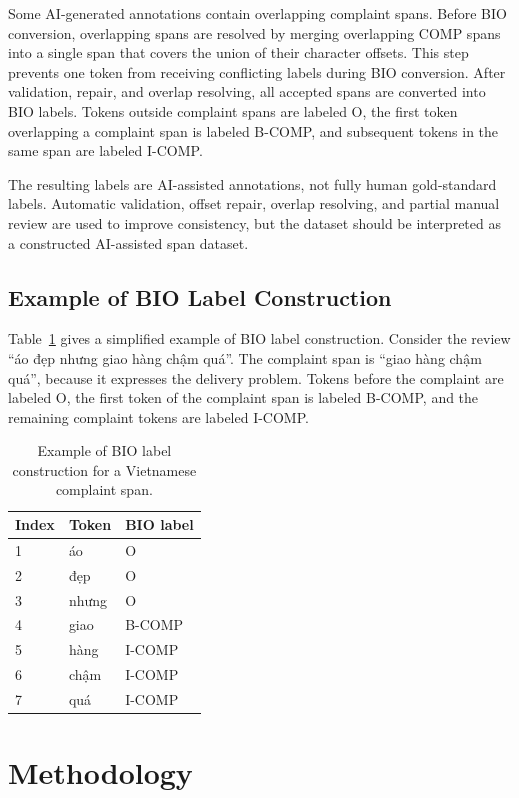 \documentclass[11pt]{article}
\begin{document}
Some AI-generated annotations contain overlapping complaint spans. Before BIO conversion, overlapping spans are resolved by merging overlapping COMP spans into a single span that covers the union of their character offsets. This step prevents one token from receiving conflicting labels during BIO conversion. After validation, repair, and overlap resolving, all accepted spans are converted into BIO labels. Tokens outside complaint spans are labeled O, the first token overlapping a complaint span is labeled B-COMP, and subsequent tokens in the same span are labeled I-COMP.

The resulting labels are AI-assisted annotations, not fully human gold-standard labels. Automatic validation, offset repair, overlap resolving, and partial manual review are used to improve consistency, but the dataset should be interpreted as a constructed AI-assisted span dataset.

\subsection{Example of BIO Label Construction}

Table~\ref{tab:bio-example} gives a simplified example of BIO label construction. Consider the review ``áo đẹp nhưng giao hàng chậm quá''. The complaint span is ``giao hàng chậm quá'', because it expresses the delivery problem. Tokens before the complaint are labeled O, the first token of the complaint span is labeled B-COMP, and the remaining complaint tokens are labeled I-COMP.

\begin{table}[t]
\centering
\small
\begin{tabular}{lll}
\toprule
Index & Token & BIO label \\
\midrule
1 & áo & O \\
2 & đẹp & O \\
3 & nhưng & O \\
4 & giao & B-COMP \\
5 & hàng & I-COMP \\
6 & chậm & I-COMP \\
7 & quá & I-COMP \\
\bottomrule
\end{tabular}
\caption{Example of BIO label construction for a Vietnamese complaint span.}
\label{tab:bio-example}
\end{table}

\section{Methodology}
\end{document}
